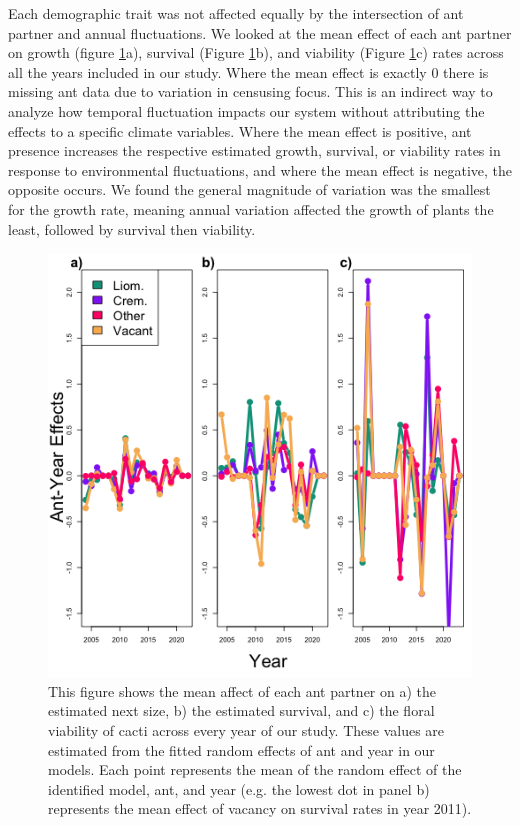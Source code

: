 \documentclass[11pt]{article}
\begin{document}
Each demographic trait was not affected equally by the intersection of ant partner and annual fluctuations.
We looked at the mean effect of each ant partner on growth (figure \ref{fig:Annual_Ant}a), survival (Figure \ref{fig:Annual_Ant}b), and viability (Figure \ref{fig:Annual_Ant}c) rates across all the years included in our study. 
Where the mean effect is exactly 0 there is missing ant data due to variation in censusing focus.
This is an indirect way to analyze how temporal fluctuation impacts our system without attributing the effects to a specific climate variables. 
Where the mean effect is positive, ant presence increases the respective estimated growth, survival, or viability rates in response to environmental fluctuations, and where the mean effect is negative, the opposite occurs. 
We found the general magnitude of variation was the smallest for the growth rate, meaning annual variation affected the growth of plants the least, followed by survival then viability. 

\begin{figure}[H]
	\includegraphics[width=0.95\linewidth]{Figures/year_ant_timeseries.png}
	\caption{This figure shows the mean affect of each ant partner on a) the estimated next size, b) the estimated survival, and c) the floral viability of cacti across every year of our study. These values are estimated from the fitted random effects of ant and year in our models. Each point represents the mean of the random effect of the identified model, ant, and year (e.g. the lowest dot in panel b) represents the mean effect of vacancy on survival rates in year 2011).}
	\label{fig:Annual_Ant}
\end{figure}
\end{document}
